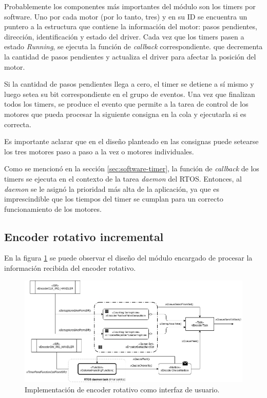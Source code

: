 \documentclass{IEEEtran}
\begin{document}
Probablemente los componentes más importantes del módulo son los timers por software. Uno por cada motor (por lo tanto, tres) y en su ID se encuentra un puntero a la estructura que contiene la información del motor: pasos pendientes, dirección, identificación y estado del driver. Cada vez que los timers pasen a estado \textit{Running}, se ejecuta la función de \textit{callback} correspondiente. que decrementa la cantidad de pasos pendientes y actualiza el driver para afectar la posición del motor. 

Si la cantidad de pasos pendientes llega a cero, el timer se detiene a sí mismo y luego setea su bit correspondiente en el grupo de eventos. Una vez que finalizan todos los timers, se produce el evento que permite a la tarea de control de los motores que pueda procesar la siguiente consigna en la cola y ejecutarla si es correcta. 

Es importante aclarar que en el diseño planteado en las consignas puede setearse los tres motores paso a paso a la vez o motores individuales.

Como se mencionó en la sección \ref{sec:software-timer}, la función de \textit{callback} de los timers se ejecuta en el contexto de la tarea \textit{daemon} del RTOS. Entonces, al \textit{daemon} se le asignó la prioridad más alta de la aplicación, ya que es imprescindible que los tiempos del timer se cumplan para un correcto funcionamiento de los motores.

\subsection{Encoder rotativo incremental}
\label{sec:encoder}

En la figura \ref{fig:diagrama-encoder} se puede observar el diseño del módulo encargado de procesar la información recibida del encoder rotativo.

\begin{figure}[ht]
    \centering
    \includegraphics[scale=0.5]{../diagrama_encoder.png}
    \caption{Implementación de encoder rotativo como interfaz de usuario.}
    \label{fig:diagrama-encoder}
\end{figure}
\end{document}

